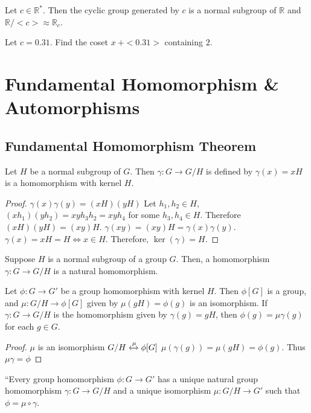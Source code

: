 \begin{remark}
	Let $c \in \mathbb{R}^*$.
	Then the cyclic group generated by $c$ is a normal subgroup of $\mathbb{R}$ and $\mathbb{R}/<c> \approx \mathbb{R}_c$.
\end{remark}

\begin{question}
	Let $c = 0.31$.
	Find the coset $x\ +<0.31>$ containing $2$.
\end{question}

\section{Fundamental Homomorphism \& Automorphisms}
\subsection{Fundamental Homomorphism Theorem}
\begin{theorem}
	Let $H$ be a normal subgroup of $G$.
	Then $\gamma : G \to G/H$ is defined by $\gamma(x) = xH$  is a homomorphism with kernel $H$.
\end{theorem}
\begin{proof}
	$\gamma(x)\gamma(y) = (xH)(yH)$
	Let $h_1,h_2 \in H$, $(xh_1)(yh_2) = xyh_3h_2 = xyh_4$ for some $h_3,h_4 \in H$.
	Therefore $(xH)(yH) = (xy)H$.
	$\gamma(xy) = (xy)H = \gamma(x)\gamma(y)$.
	$\gamma(x) = xH = H \iff x \in H$.
	Therefore, $\ker(\gamma) = H$.
\end{proof}

\begin{remark}
	Suppose $H$ is a normal subgroup of a group $G$.
	Then, a homomorphism $\gamma : G \to G/H$ is a natural homomorphism.
\end{remark}

\begin{theorem}
	Let $\phi : G \to G'$ be a group homomorphism with kernel $H$.
	Then $\phi[G]$ is a group, and $\mu : G/H \to \phi[G]$ given by $\mu(gH) = \phi(g)$ is an isomorphism.
	If $\gamma : G \to G/H$ is the homomorphism given by $\gamma(g) = gH$, then $\phi(g) = \mu\gamma(g)$ for each $g \in G$.
\end{theorem}
\begin{proof}
	$\mu$ is an isomorphism $G/H \xleftrightarrow{\mu}\phi[G]$
	$\mu(\gamma(g)) = \mu(gH) = \phi(g)$.
	Thus $\mu\gamma = \phi$
\end{proof}
``Every group homomorphism $\phi : G \to G'$ has a unique natural group homomorphism $\gamma : G \to G/H$ and a unique isomorphism $\mu : G/H \to G'$ such that $\phi = \mu \circ \gamma$.

